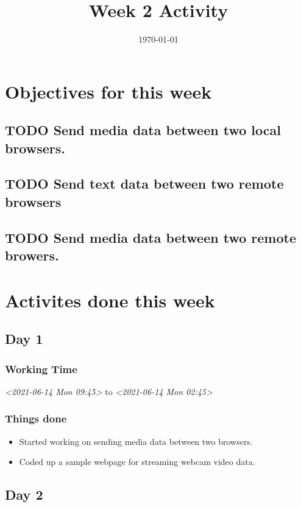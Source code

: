 \documentclass[11pt]{article}
\date{\today}
\title{Week 2 Activity}
\begin{document}
\maketitle

\section*{Objectives for this week}
\label{sec:org709a4b8}
\subsection*{{\bfseries\sffamily TODO} Send media data between two local browsers.}
\label{sec:org00dbd0a}
\subsection*{{\bfseries\sffamily TODO} Send text data between two remote browsers}
\label{sec:org1cf59a0}
\subsection*{{\bfseries\sffamily TODO} Send media data between two remote browers.}
\label{sec:org3a182fa}

\section*{Activites done this week}
\label{sec:org8d0e47c}
\subsection*{Day 1}
\label{sec:org3536abd}
\subsubsection*{Working Time}
\label{sec:org8e77d75}
\textit{<2021-06-14 Mon 09:45> } to \textit{<2021-06-14 Mon 02:45>}

\subsubsection*{Things done}
\label{sec:orgb4e2d7e}
\begin{itemize}
\item Started working on sending media data between two browsers.
\item Coded up a sample webpage for streaming webcam video data.
\end{itemize}

\subsection*{Day 2}
\label{sec:org05bd1d2}
\end{document}
